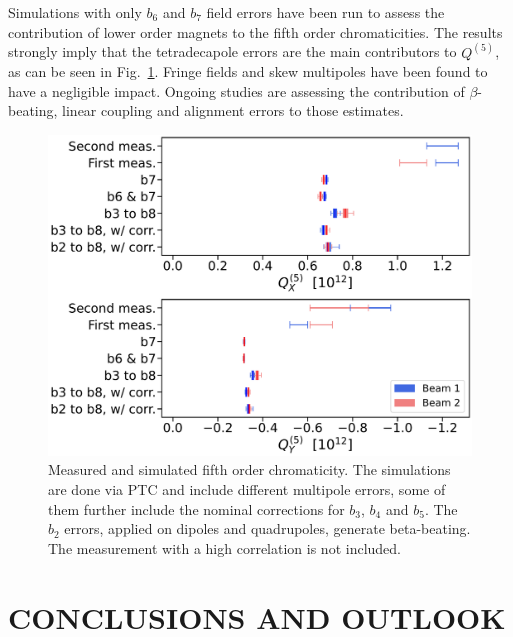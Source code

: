 Simulations with only $b_6$ and $b_7$ field errors have been run to assess the contribution of lower order magnets to the fifth order chromaticities. The results strongly imply that the tetradecapole errors are the main contributors to $Q^{(5)}$, as can be seen in Fig.~\ref{beam1_q5x_ptc}.
Fringe fields and skew multipoles have been found to have a negligible impact.
Ongoing studies are assessing the contribution of $\beta$-beating, linear coupling and alignment errors to those estimates.

\begin{figure}[tbh]
    \centering
    \includegraphics[width=1\columnwidth]{images/MOPL027_f4-1.pdf}
    \caption{Measured and simulated fifth order chromaticity. 
             The simulations are done via PTC and include different multipole errors, some of them further
             include the nominal corrections for $b_3$, $b_4$ and $b_5$.
             The $b_2$ errors, applied on dipoles and quadrupoles, generate beta-beating.
             The measurement with a high correlation is not included.}
    \label{beam1_q5x_ptc}
\end{figure}


\section{CONCLUSIONS AND OUTLOOK}

